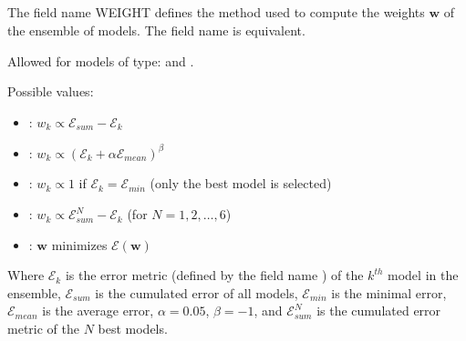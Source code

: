 \documentclass[letterpaper,10pt,english]{sphinxmanual}
\begin{document}
\subsection{}
\label{\detokenize{SgteLib:weight}}\label{\detokenize{SgteLib:id21}}
\begin{DUlineblock}{0em}
\item[] The field name WEIGHT defines the method used to compute the weights \(\boldsymbol{w}\) of the ensemble of models. The field name  is equivalent.
\item[] Allowed for models of type: {\hyperref[\detokenize{SgteLib:ensemble}]{}} and {\hyperref[\detokenize{SgteLib:ensemble-stat}]{}}.
\item[] Possible values:
\end{DUlineblock}
\begin{itemize}
\item {} 
\sphinxAtStartPar
{}: \(w_k \propto \mathcal{E}_{sum} - \mathcal{E}_k\)

\item {} 
\sphinxAtStartPar
{}: \(w_k \propto (\mathcal{E}_k + \alpha\mathcal{E}_{mean})^{\beta}\)

\item {} 
\sphinxAtStartPar
{}: \(w_k \propto 1\) if \(\mathcal{E}_k = \mathcal{E}_{min}\) (only the best model is selected)

\item {} 
\sphinxAtStartPar
{}: \(w_k \propto \mathcal{E}_{sum}^N - \mathcal{E}_k\) (for \(N=1,2,\dots,6\))

\item {} 
\sphinxAtStartPar
{}: \(\boldsymbol{w}\) minimizes \(\mathcal{E}(\boldsymbol{w})\)

\end{itemize}

\sphinxAtStartPar
Where \(\mathcal{E}_k\) is the error metric (defined by the field name {\hyperref[\detokenize{SgteLib:metric}]{}}) of the \(k^{th}\) model in the ensemble,
\(\mathcal{E}_{sum}\) is the cumulated error of all models,
\(\mathcal{E}_{min}\) is the minimal error,
\(\mathcal{E}_{mean}\) is the average error,
\(\alpha=0.05\), \(\beta=-1\),
and \(\mathcal{E}_{sum}^N\) is the cumulated error metric of the \(N\) best models.
\end{document}
